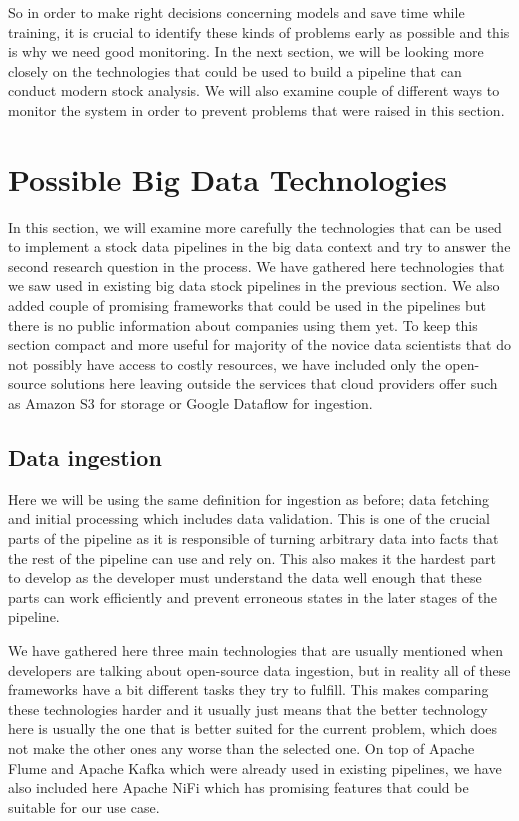 So in order to make right decisions concerning models and save time while training, it is crucial to identify these kinds of problems early as possible and this is why we need good monitoring.
In the next section, we will be looking more closely on the technologies that could be used to build a pipeline that can conduct modern stock analysis.
We will also examine couple of different ways to monitor the system in order to prevent problems that were raised in this section.



\section{Possible Big Data Technologies}

In this section, we will examine more carefully the technologies that can be used to implement a stock data pipelines in the big data context and try to answer the second research question in the process.
We have gathered here technologies that we saw used in existing big data stock pipelines in the previous section.
We also added couple of promising frameworks that could be used in the pipelines but there is no public information about companies using them yet.
To keep this section compact and more useful for majority of the novice data scientists that do not possibly have access to costly resources, we have included only the open-source solutions here leaving outside the services that cloud providers offer such as Amazon S3 for storage or Google Dataflow for ingestion.

\subsection{Data ingestion}

Here we will be using the same definition for ingestion as before; data fetching and initial processing which includes data validation.
This is one of the crucial parts of the pipeline as it is responsible of turning arbitrary data into facts that the rest of the pipeline can use and rely on.
This also makes it the hardest part to develop as the developer must understand the data well enough that these parts can work efficiently and prevent erroneous states in the later stages of the pipeline.

We have gathered here three main technologies that are usually mentioned when developers are talking about open-source data ingestion, but in reality all of these frameworks have a bit different tasks they try to fulfill.
This makes comparing these technologies harder and it usually just means that the better technology here is usually the one that is better suited for the current problem, which does not make the other ones any worse than the selected one.
On top of Apache Flume and Apache Kafka which were already used in existing pipelines, we have also included here Apache NiFi which has promising features that could be suitable for our use case.


